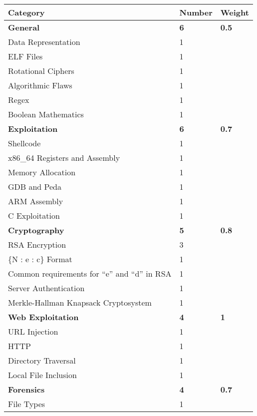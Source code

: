 \documentclass[a4paper,11pt]{report}
\begin{document}
		\begin{table}[htb]
			\centering
			\begin{tabular}{| l | l | l |}
				\hline
				\textbf{Category} & \textbf{Number} & \textbf{Weight} \\ \hline 
				\textbf{General} & \textbf{6} & \textbf{0.5} \\ \hline
				\quad Data Representation & 1 & \\ \hline
				\quad ELF Files & 1 & \\ \hline
				\quad Rotational Ciphers & 1 & \\ \hline
				\quad Algorithmic Flaws & 1 & \\ \hline 
				\quad Regex & 1 & \\ \hline 
				\quad Boolean Mathematics & 1 & \\ \hline 
				\textbf{Exploitation} & \textbf{6} & \textbf{0.7}\\ \hline
				\quad Shellcode & 1 & \\ \hline
				\quad x86\_64 Registers and Assembly & 1 & \\ \hline
				\quad Memory Allocation & 1 & \\ \hline
				\quad GDB and Peda & 1 & \\ \hline
				\quad ARM Assembly & 1 & \\ \hline
				\quad C Exploitation & 1 & \\ \hline 
				\textbf{Cryptography} & \textbf{5} & \textbf{0.8} \\ \hline
				\quad RSA Encryption & 3 & \\ \hline
				\qquad \{N : e : c\} Format & 1 & \\ \hline
				\qquad Common requirements for ``e'' and ``d'' in RSA & 1 & \\ \hline
				\quad Server Authentication & 1 & \\ \hline
				\quad Merkle-Hallman Knapsack Cryptosystem & 1 & \\ \hline
				\textbf{Web Exploitation} & \textbf{4} & \textbf{1} \\ \hline
				\quad URL Injection & 1 & \\ \hline
				\quad HTTP & 1 & \\ \hline 
				\quad Directory Traversal & 1 & \\ \hline
				\quad Local File Inclusion & 1 & \\ \hline 
				\textbf{Forensics} & \textbf{4} & \textbf{0.7} \\ \hline
				\quad File Types & 1 & \\ \hline

\end{tabular}
\end{table}
\end{document}

